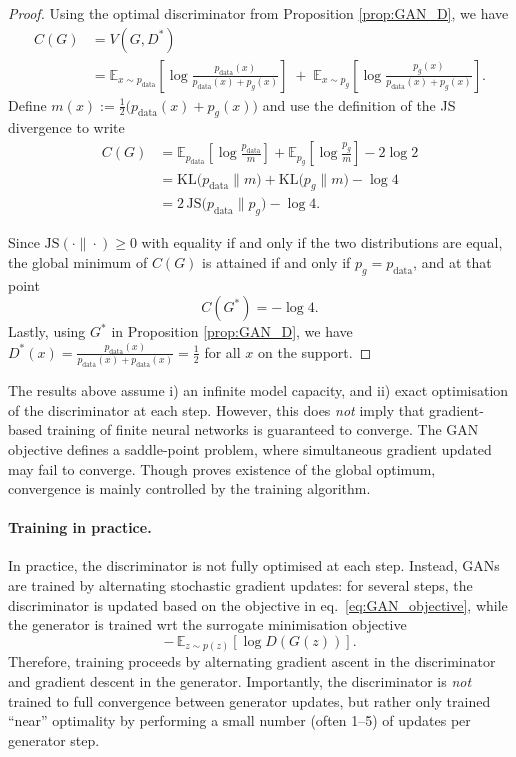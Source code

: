 \begin{proof}
Using the optimal discriminator from Proposition \ref{prop:GAN_D}, we have 
\begin{align*}
C(G) &= V(G,D^*) \\
&= \mathbb{E}_{x\sim p_{\mathrm{data}}}\!\left[\log \frac{p_{\mathrm{data}}(x)}{p_{\mathrm{data}}(x)+p_g(x)}\right]
\;+\;
\mathbb{E}_{x\sim p_g}\!\left[\log \frac{p_g(x)}{p_{\mathrm{data}}(x)+p_g(x)}\right].
\end{align*}
Define $m(x):=\tfrac12\big(p_{\mathrm{data}}(x)+p_g(x)\big)$ and use the definition of the JS divergence to write
\begin{align*}
C(G)
&=
\mathbb{E}_{p_{\mathrm{data}}}\!\left[\log \frac{p_{\mathrm{data}}}{m}\right]
+
\mathbb{E}_{p_g}\!\left[\log \frac{p_g}{m}\right]
- 2\log 2 \\
&=
\mathrm{KL}\!\big(p_{\mathrm{data}}\|m\big) + \mathrm{KL}\!\big(p_g\|m\big) - \log 4\\
&=
2\,\mathrm{JS}\!\big(p_{\mathrm{data}}\|p_g\big) - \log 4 .
\end{align*}

Since $\mathrm{JS}(\cdot\|\cdot)\ge 0$ with equality if and only if the two distributions are equal, the global minimum of $C(G)$ is attained if and only if $p_g=p_{\mathrm{data}}$, and at that point
\[
C(G^*)=-\log 4.
\]
Lastly, using $G^*$ in Proposition \ref{prop:GAN_D}, we have   
$D^*(x)=\frac{p_{\mathrm{data}}(x)}{p_{\mathrm{data}}(x)+p_{\mathrm{data}}(x)}=\tfrac12$  for all $x$ on the support.
\end{proof}

\begin{remark}
The results above assume i) an infinite model capacity, and ii) exact optimisation of the discriminator at each step. However, this does \emph{not} imply that gradient-based training of finite neural networks is guaranteed to converge. The GAN objective defines a saddle-point problem, where  simultaneous gradient updated may fail to converge. Though \cite{goodfellow2014gan} proves existence of the global optimum, convergence is mainly controlled by the training algorithm.
\end{remark}


\paragraph{Training in practice.} In practice, the discriminator is not fully optimised at each step. Instead, GANs are trained by alternating stochastic gradient updates: for several steps, the discriminator is updated based on the objective in eq.~\eqref{eq:GAN_objective}, while the generator is trained wrt the surrogate minimisation objective 
\[
-\,\mathbb{E}_{z\sim p(z)}[\log D(G(z))].
\]
Therefore, training proceeds by alternating gradient ascent in the discriminator
and gradient descent in the generator. Importantly, the discriminator is \emph{not} trained to full convergence between generator updates, but rather only trained ``near'' optimality by performing a small number (often 1--5) of updates per generator step. 

